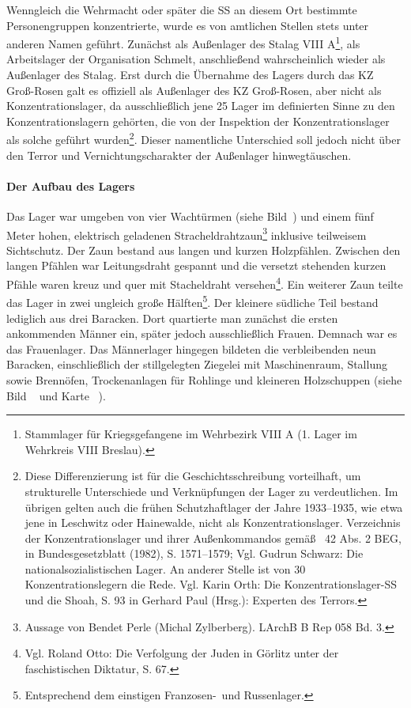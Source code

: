 \documentclass[a4paper,12pt,ngerman,
]{nisebook}
\begin{document}
Wenngleich die Wehrmacht oder später die SS an diesem Ort bestimmte Personengruppen \glqq konzentrierte\grqq, wurde es von amtlichen Stellen stets unter anderen Namen geführt. Zunächst als Außenlager des Stalag VIII A\footnote{Stammlager für Kriegsgefangene im Wehrbezirk VIII A (1. Lager im Wehrkreis VIII Breslau).}, als Arbeitslager der Organisation Schmelt, anschließend wahrscheinlich wieder als Außenlager des Stalag.
Erst durch die Übernahme des Lagers durch das KZ Groß-Rosen galt es offiziell als Außenlager des KZ Groß-Rosen, aber nicht als Konzentrationslager, da ausschließlich jene 25 Lager im definierten Sinne zu den Konzentrationslagern gehörten, die von der Inspektion der Konzentrationslager als solche geführt wurden\footnote{Diese Differenzierung ist für die Geschichtsschreibung vorteilhaft, um strukturelle Unterschiede und Verknüpfungen der Lager zu verdeutlichen. Im übrigen gelten auch die frühen Schutzhaftlager der Jahre 1933--1935, wie etwa jene in Leschwitz oder Hainewalde, nicht als Konzentrationslager. Verzeichnis der Konzentrationslager und ihrer Außenkommandos gemäß \textsection~42 Abs. 2 BEG, in Bundesgesetzblatt (1982), S. 1571--1579; Vgl. Gudrun Schwarz: Die nationalsozialistischen Lager.
An anderer Stelle ist von 30 Konzentrationslegern die Rede. Vgl. Karin Orth: Die Konzentrationslager-SS und die Shoah, S. 93 in Gerhard Paul (Hrsg.): Experten des Terrors.}. Dieser namentliche Unterschied soll jedoch nicht über den Terror und Vernichtungscharakter der Außenlager hinwegtäuschen.

\paragraph{Der Aufbau des Lagers} Das Lager war umgeben von vier Wachtürmen (siehe Bild~) und einem fünf Meter hohen, elektrisch geladenen Stracheldrahtzaun\footnote{Aussage von Bendet Perle (Michal Zylberberg). LArchB B Rep 058 Bd. 3.} inklusive teilweisem Sichtschutz. Der Zaun bestand aus langen und kurzen Holzpfählen. Zwischen den langen Pfählen war Leitungsdraht gespannt und die versetzt stehenden kurzen Pfähle waren kreuz und quer mit Stacheldraht versehen\footnote{Vgl. Roland Otto: Die Verfolgung der Juden in Görlitz unter der faschistischen Diktatur, S. 67.}. Ein weiterer Zaun teilte das Lager in zwei ungleich große Hälften\footnote{Entsprechend dem einstigen \glqq Franzosen-\grqq~und \glqq Russenlager\grqq.}. Der kleinere südliche Teil bestand lediglich aus drei Baracken. Dort quartierte man zunächst die ersten ankommenden Männer ein, später jedoch ausschließlich Frauen. Demnach war es das Frauenlager. Das Männerlager hingegen bildeten die verbleibenden neun Baracken, einschließlich der stillgelegten Ziegelei mit Maschinenraum, Stallung sowie Brennöfen, Trockenanlagen für Rohlinge und kleineren Holzschuppen (siehe Bild ~ und Karte ~).\newline
\end{document}

